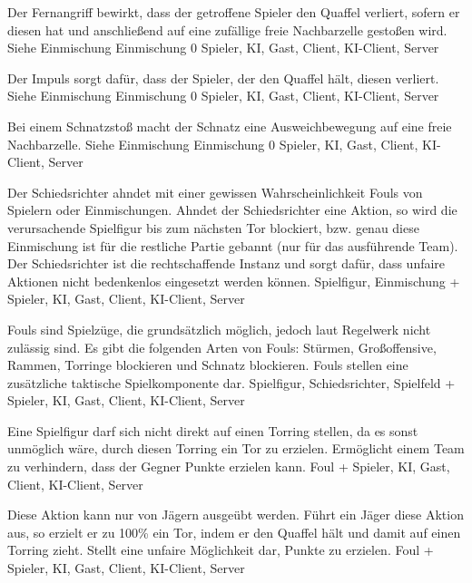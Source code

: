         {Der Fernangriff bewirkt, dass der getroffene Spieler den Quaffel verliert, sofern er diesen hat und anschließend auf eine zufällige freie Nachbarzelle gestoßen wird.}
        {Siehe Einmischung}
        {Einmischung}
        {0}
        {Spieler, KI, Gast, Client, KI-Client, Server}

        {Der Impuls sorgt dafür, dass der Spieler, der den Quaffel hält, diesen verliert.}
        {Siehe Einmischung}
        {Einmischung}
        {0}
        {Spieler, KI, Gast, Client, KI-Client, Server}

        {Bei einem Schnatzstoß macht der Schnatz eine Ausweichbewegung auf eine freie Nachbarzelle.}
        {Siehe Einmischung}
        {Einmischung}
        {0}
        {Spieler, KI, Gast, Client, KI-Client, Server}
        
        {Der Schiedsrichter ahndet mit einer gewissen Wahrscheinlichkeit Fouls von Spielern oder Einmischungen. Ahndet der Schiedsrichter eine Aktion, so wird die verursachende Spielfigur bis zum nächsten Tor blockiert, bzw. genau diese Einmischung ist für die restliche Partie gebannt (nur für das ausführende Team).}
        {Der Schiedsrichter ist die rechtschaffende Instanz und sorgt dafür, dass unfaire Aktionen nicht bedenkenlos eingesetzt werden können.}
        {Spielfigur, Einmischung}
        {+}
        {Spieler, KI, Gast, Client, KI-Client, Server}

        {Fouls sind Spielzüge, die grundsätzlich möglich, jedoch laut Regelwerk nicht zulässig sind. Es gibt die folgenden Arten von Fouls: Stürmen, Großoffensive, Rammen, Torringe blockieren und Schnatz blockieren.}
        {Fouls stellen eine zusätzliche taktische Spielkomponente dar.}
        {Spielfigur, Schiedsrichter, Spielfeld}
        {+}
        {Spieler, KI, Gast, Client, KI-Client, Server}

        {Eine Spielfigur darf sich nicht direkt auf einen Torring stellen, da es sonst unmöglich wäre, durch diesen Torring ein Tor zu erzielen.}
        {Ermöglicht einem Team zu verhindern, dass der Gegner Punkte erzielen kann.}
        {Foul}
        {+}
        {Spieler, KI, Gast, Client, KI-Client, Server}

        {Diese Aktion kann nur von Jägern ausgeübt werden. Führt ein Jäger diese Aktion aus, so erzielt er zu 100\% ein Tor, indem er den Quaffel hält und damit auf einen Torring zieht.}
        {Stellt eine unfaire Möglichkeit dar, Punkte zu erzielen.}
        {Foul}
        {+}
        {Spieler, KI, Gast, Client, KI-Client, Server}

